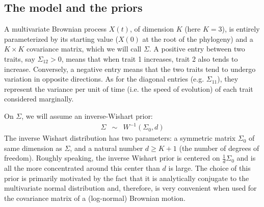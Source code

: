 \documentclass[usletter]{article}
\begin{document}
\subsection*{The model and the priors}

A multivariate Brownian process $X(t)$, of dimension $K$ (here $K=3$),
is entirely parameterized by its starting value ($X(0)$ at the root of the phylogeny) and a $K \times K$ covariance matrix, which we will call $\Sigma$. A positive entry between two traits, say $\Sigma_{12} > 0$, means that when trait 1 increases, trait 2 also tends to increase. Conversely, a negative entry means that the two traits tend to undergo variation in opposite directions.
As for the diagonal entries (e.g. $\Sigma_{11}$), they represent the variance per unit of time (i.e. the speed of evolution) of each trait considered marginally.

On $\Sigma$, we will assume an inverse-Wishart prior:
\begin{eqnarray*}
\Sigma &\sim& W^{-1}(\Sigma_0, d)
\end{eqnarray*}
The inverse Wishart distribution has two parameters: a symmetric matrix $\Sigma_0$ of same dimension as $\Sigma$, and a natural number $d \ge K+1$ (the number of degrees of freedom). Roughly speaking, the inverse Wishart prior is centered on $\frac{1}{d} \Sigma_0$ and is all the more concentrated around this center than $d$ is large.
The choice of this prior is primarily motivated by the fact that it is analytically conjugate to the multivariate normal distribution and, therefore, is very convenient when used for the covariance matrix of a (log-normal) Brownian motion.
\end{document}
